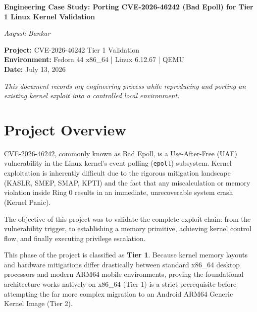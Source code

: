 \documentclass[11pt,a4paper]{article}
\begin{document}
\begin{titlepage}
    \centering
    \vspace*{2cm}
    
    {\Huge\bfseries Engineering Case Study: Porting CVE-2026-46242 (Bad Epoll) for Tier 1 Linux Kernel Validation\par}
    
    \vspace{2cm}
    
    {\Large\itshape Aayush Bankar\par}
    
    \vspace{2cm}
    
    \textbf{Project:} CVE-2026-46242 Tier 1 Validation \\
    \textbf{Environment:} Fedora 44 x86\_64 | Linux 6.12.67 | QEMU \\
    \textbf{Date:} July 13, 2026
    
    \vfill
    
    \textit{This document records my engineering process while reproducing and porting an existing kernel exploit into a controlled local environment.}
    
    \vspace{1cm}
\end{titlepage}

\tableofcontents
\newpage

\section{Project Overview}
CVE-2026-46242, commonly known as Bad Epoll, is a Use-After-Free (UAF) vulnerability in the Linux kernel's event polling (\texttt{epoll}) subsystem. Kernel exploitation is inherently difficult due to the rigorous mitigation landscape (KASLR, SMEP, SMAP, KPTI) and the fact that any miscalculation or memory violation inside Ring 0 results in an immediate, unrecoverable system crash (Kernel Panic).

The objective of this project was to validate the complete exploit chain: from the vulnerability trigger, to establishing a memory primitive, achieving kernel control flow, and finally executing privilege escalation. 

This phase of the project is classified as \textbf{Tier 1}. Because kernel memory layouts and hardware mitigations differ drastically between standard x86\_64 desktop processors and modern ARM64 mobile environments, proving the foundational architecture works natively on x86\_64 (Tier 1) is a strict prerequisite before attempting the far more complex migration to an Android ARM64 Generic Kernel Image (Tier 2).
\end{document}
